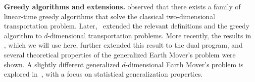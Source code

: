 
\textbf{Greedy algorithms and extensions.}
\cite{hoffman1963simple} observed that there exists a family of linear-time greedy algorithms that solve the classical two-dimensional transportation problem. %
Later,~\cite{BEIN199597} extended
the relevant definitions and the greedy algorithm to $d$-dimensional transportation problems.
More recently, the results in \cite{kline2019properties}, 
which we will use here, further extended this result to the dual program,  
and several theoretical properties of the generalized Earth Mover's problem were shown. 
A slightly different generalized 
$d$-dimensional Earth Mover's problem is explored in~\cite{erickson2020generalization}, 
with a focus on statistical generalization properties.






